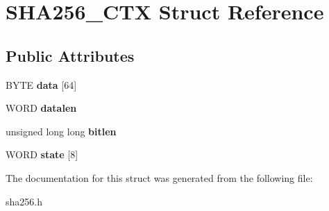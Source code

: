 \hypertarget{structSHA256__CTX}{\section{S\-H\-A256\-\_\-\-C\-T\-X Struct Reference}
\label{structSHA256__CTX}
}
\subsection*{Public Attributes}
\begin{DoxyCompactItemize}
\item 
\hypertarget{structSHA256__CTX_ac4cf981ce4100c3af150be3c98b2d03e}{B\-Y\-T\-E {\bfseries data} \mbox{[}64\mbox{]}}\label{structSHA256__CTX_ac4cf981ce4100c3af150be3c98b2d03e}

\item 
\hypertarget{structSHA256__CTX_acff27dfecde1d6e42f7c8474a3175529}{W\-O\-R\-D {\bfseries datalen}}\label{structSHA256__CTX_acff27dfecde1d6e42f7c8474a3175529}

\item 
\hypertarget{structSHA256__CTX_a7971befc0fa37b07350552d3a949634a}{unsigned long long {\bfseries bitlen}}\label{structSHA256__CTX_a7971befc0fa37b07350552d3a949634a}

\item 
\hypertarget{structSHA256__CTX_a09c4eef8a0dc02bc9860e2a02c3f2638}{W\-O\-R\-D {\bfseries state} \mbox{[}8\mbox{]}}\label{structSHA256__CTX_a09c4eef8a0dc02bc9860e2a02c3f2638}

\end{DoxyCompactItemize}


The documentation for this struct was generated from the following file\-:\begin{DoxyCompactItemize}
\item 
sha256.\-h\end{DoxyCompactItemize}
